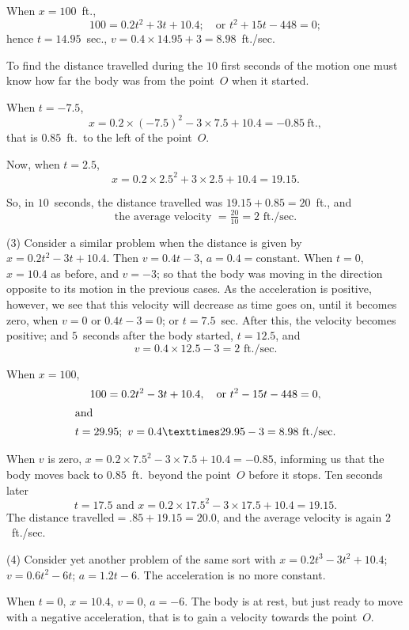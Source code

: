 \documentclass[12pt]{book}[2005/09/16]
\newcommand{\DPPageSep}[2]{\Pagelabel{#2}}
\newcommand{\Pagelabel}[1]
  {\phantomsection\label{#1}}
\begin{document}
When $x = 100$~ft.,
\[
100 = 0.2t^2 + 3t + 10.4;\quad \text{or } t^2 + 15t - 448 = 0;
\]
hence $t = 14.95$~sec., $v = 0.4 × 14.95 + 3 = 8.98$~ft./sec.

To find the distance travelled during the $10$ first
seconds of the motion one must know how far the
body was from the point~$O$ when it started.

When $t = -7.5$,
\[
x = 0.2 × (-7.5)^2 - 3 × 7.5 + 10.4 = -0.85~\text{ft}.,
\]
that is $0.85$~ft.\ to the left of the point~$O$.

Now, when $t = 2.5$,
\[
x = 0.2 × 2.5^2 + 3 × 2.5 + 10.4 = 19.15.
\]

So, in $10$~seconds, the distance travelled was
$19.15 + 0.85 = 20$~ft., and
\[
\text{the average velocity } = \tfrac{20}{10} = 2 \text{ ft./sec}.
\]

(3) Consider a similar problem when the distance
is given by $x = 0.2t^2 - 3t + 10.4$. Then $v = 0.4t - 3$,
$a = 0.4 = \text{constant}$. When $t = 0$, $x = 10.4$ as before, and
\DPPageSep{074.png}{62}%
$v = -3$; so that the body was moving in the direction
opposite to its motion in the previous cases. As the
acceleration is positive, however, we see that this
velocity will decrease as time goes on, until it becomes
zero, when $v = 0$ or $0.4t - 3 = 0$; or $t = 7.5$~sec. After
this, the velocity becomes positive; and $5$~seconds
after the body started, $t = 12.5$, and
\[
v = 0.4 × 12.5 - 3 = 2 \text{ ft./sec}.
\]

When $x = 100$,
\begin{gather*}
100 = 0.2t^2 - 3t + 10.4,\quad \text{or } t^2 - 15t - 448 = 0, \\
\intertext{and}
t = 29.95;\ v = 0.4 × 29.95 - 3 = 8.98~\text{ft./sec.}
\end{gather*}

When $v$ is zero, $x = 0.2 × 7.5^2 - 3 × 7.5 + 10.4 = -0.85$,
informing us that the body moves back to $0.85$~ft.\
beyond the point~$O$ before it stops. Ten seconds later
\[
t = 17.5 \text{ and } x = 0.2 × 17.5^2 - 3 × 17.5 + 10.4 = 19.15.
\]
$\text{The distance travelled} = .85 + 19.15 = 20.0$, and the
average velocity is again $2$~ft./sec.

(4) Consider yet another problem of the same sort
with $x = 0.2t^3 - 3t^2 + 10.4$; $v = 0.6t^2 - 6t$; $a = 1.2t - 6$.
The acceleration is no more constant.

When $t = 0$, $x = 10.4$, $v = 0$, $a = -6$. The body is
at rest, but just ready to move with a negative
acceleration, that is to gain a velocity towards the
point~$O$.
\end{document}
